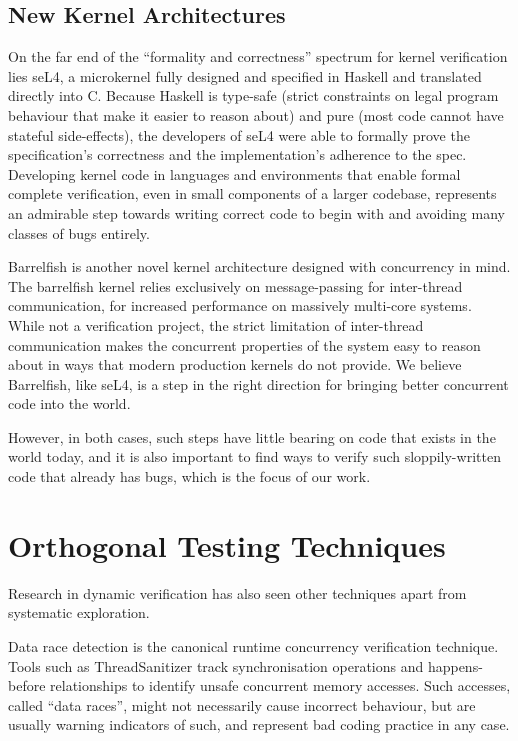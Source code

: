 \subsection{New Kernel Architectures}

On the far end of the ``formality and correctness'' spectrum for kernel verification lies seL4\hspace{0in}\cite{sel4}, a microkernel fully designed and specified in Haskell and translated directly into C. Because Haskell is type-safe (strict constraints on legal program behaviour that make it easier to reason about) and pure (most code cannot have stateful side-effects), the developers of seL4 were able to formally prove the specification's correctness and the implementation's adherence to the spec.
Developing kernel code in languages and environments that enable formal complete verification, even in small components of a larger codebase, represents an admirable step towards writing correct code to begin with and avoiding many classes of bugs entirely.

Barrelfish\cite{barrelfish} is another novel kernel architecture designed with concurrency in mind. The barrelfish kernel relies exclusively on message-passing for inter-thread communication, for increased performance on massively multi-core systems. While not a verification project, the strict limitation of inter-thread communication makes the concurrent properties of the system easy to reason about in ways that modern production kernels do not provide.
We believe Barrelfish, like seL4, is a step in the right direction for bringing better concurrent code into the world.

However, in both cases, such steps have little bearing on code that exists in the world today, and it is also important to find ways to verify such sloppily-written code that already has bugs, which is the focus of our work.

\section{Orthogonal Testing Techniques}
\label{sec:related-orthogonal}

Research in dynamic verification has also seen other techniques apart from systematic exploration.

Data race detection is the canonical runtime concurrency verification technique. Tools such as ThreadSanitizer\cite{tsan} track synchronisation operations and happens-before relationships to identify unsafe concurrent memory accesses. Such accesses, called ``data races'', might not necessarily cause incorrect behaviour, but are usually warning indicators of such, and represent bad coding practice in any case.

